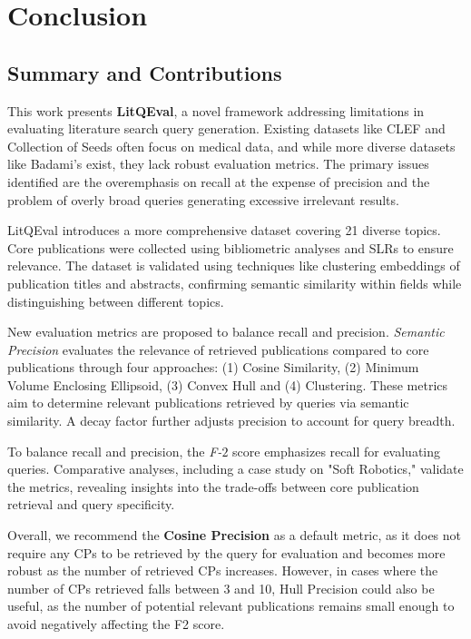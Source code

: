 {\let\clearpage\relax \chapter{Conclusion}\label{ch:conclusion}}

\section{Summary and Contributions}
This work presents \textbf{LitQEval}, a novel framework addressing limitations in evaluating literature search query generation. Existing datasets like CLEF and Collection of Seeds often focus on medical data, and while more diverse datasets like Badami’s \autocite{badami2023adaptive} exist, they lack robust evaluation metrics. The primary issues identified are the overemphasis on recall at the expense of precision and the problem of overly broad queries generating excessive irrelevant results. 

LitQEval introduces a more comprehensive dataset covering 21 diverse topics. Core publications were collected using bibliometric analyses and SLRs to ensure relevance. The dataset is validated using techniques like clustering embeddings of publication titles and abstracts, confirming semantic similarity within fields while distinguishing between different topics.

New evaluation metrics are proposed to balance recall and precision. \textit{Semantic Precision} evaluates the relevance of retrieved publications compared to core publications through four approaches: (1) Cosine Similarity, (2) Minimum Volume Enclosing Ellipsoid, (3) Convex Hull and (4) Clustering. These metrics aim to determine relevant publications retrieved by queries via semantic similarity. A decay factor further adjusts precision to account for query breadth.

To balance recall and precision, the \textit{ F-$2$ } score emphasizes recall for evaluating queries. Comparative analyses, including a case study on "Soft Robotics," validate the metrics, revealing insights into the trade-offs between core publication retrieval and query specificity.

Overall, we recommend the \textbf{Cosine Precision} as a default metric, as it does not require any CPs to be retrieved by the query for evaluation and becomes more robust as the number of retrieved CPs increases. However, in cases where the number of CPs retrieved falls between 3 and 10, Hull Precision could also be useful, as the number of potential relevant publications remains small enough to avoid negatively affecting the F2 score.

